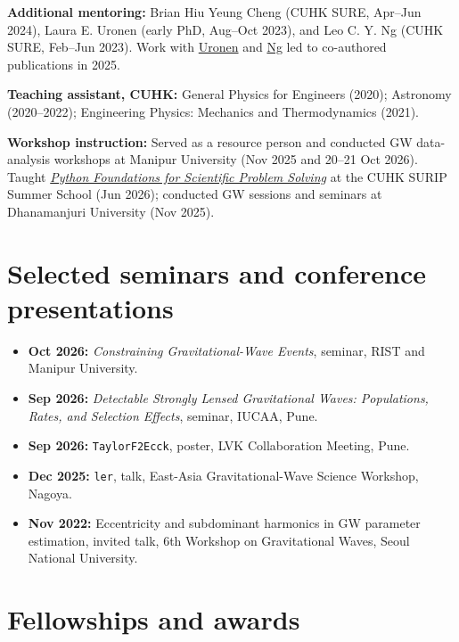 \documentclass[11pt]{article}
\begin{document}
\textbf{Additional mentoring:} Brian Hiu Yeung Cheng (CUHK SURE, Apr--Jun 2024), Laura E. Uronen (early PhD, Aug--Oct 2023), and Leo C. Y. Ng (CUHK SURE, Feb--Jun 2023). Work with \href{https://arxiv.org/abs/2406.14257}{Uronen} and \href{https://arxiv.org/abs/2403.16532}{Ng} led to co-authored publications in 2025.

\textbf{Teaching assistant, CUHK:} General Physics for Engineers (2020); Astronomy (2020--2022); Engineering Physics: Mechanics and Thermodynamics (2021).

\textbf{Workshop instruction:} Served as a resource person and conducted GW data-analysis workshops at Manipur University (Nov 2025 and 20--21 Oct 2026). Taught \href{https://gw.phy.cuhk.edu.hk/activities/surip-summer-school-2026/}{\textit{Python Foundations for Scientific Problem Solving}} at the CUHK SURIP Summer School (Jun 2026); conducted GW sessions and seminars at Dhanamanjuri University (Nov 2025).

\section*{Selected seminars and conference presentations}
\begin{itemize}
\item \textbf{Oct 2026:} \textit{Constraining Gravitational-Wave Events}, seminar, RIST and Manipur University.
\item \textbf{Sep 2026:} \textit{Detectable Strongly Lensed Gravitational Waves: Populations, Rates, and Selection Effects}, seminar, IUCAA, Pune.
\item \textbf{Sep 2026:} \texttt{TaylorF2Ecck}, poster, LVK Collaboration Meeting, Pune.
\item \textbf{Dec 2025:} \texttt{ler}, talk, East-Asia Gravitational-Wave Science Workshop, Nagoya.
\item \textbf{Nov 2022:} Eccentricity and subdominant harmonics in GW parameter estimation, invited talk, 6th Workshop on Gravitational Waves, Seoul National University.
\end{itemize}

\section*{Fellowships and awards}
\end{document}
